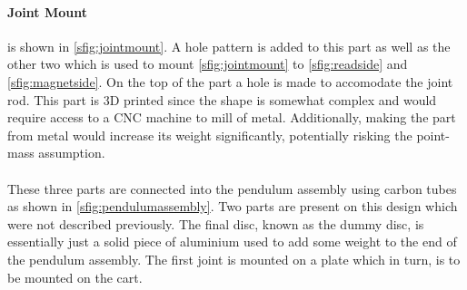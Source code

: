 \paragraph{Joint Mount} %
\label{par:joint_mount}
is shown in \ref{sfig:jointmount}.
A hole pattern is added to this part as well as the other two which is used to mount \ref{sfig:jointmount} to \ref{sfig:readside} and \ref{sfig:magnetside}.
On the top of the part a hole is made to accomodate the joint rod.
This part is 3D printed since the shape is somewhat complex and would require access to a CNC machine to mill of metal.
Additionally, making the part from metal would increase its weight significantly, potentially risking the point-mass assumption.
\\~\\
These three parts are connected into the pendulum assembly using carbon tubes as shown in \ref{sfig:pendulumassembly}.
Two parts are present on this design which were not described previously.
The final disc, known as the dummy disc, is essentially just a solid piece of aluminium used to add some weight to the end of the pendulum assembly.
The first joint is mounted on a plate which in turn, is to be mounted on the cart.

